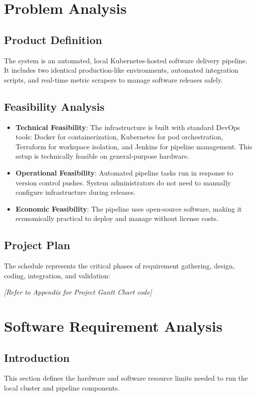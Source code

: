 \documentclass[12pt,a4paper]{article}
\begin{document}
\section{Problem Analysis}
\subsection{Product Definition}
The system is an automated, local Kubernetes-hosted software delivery pipeline. It includes two identical production-like environments, automated integration scripts, and real-time metric scrapers to manage software releases safely.

\subsection{Feasibility Analysis}
\begin{itemize}
    \item \textbf{Technical Feasibility}: The infrastructure is built with standard DevOps tools: Docker for containerization, Kubernetes for pod orchestration, Terraform for workspace isolation, and Jenkins for pipeline management. This setup is technically feasible on general-purpose hardware.
    \item \textbf{Operational Feasibility}: Automated pipeline tasks run in response to version control pushes. System administrators do not need to manually configure infrastructure during releases.
    \item \textbf{Economic Feasibility}: The pipeline uses open-source software, making it economically practical to deploy and manage without license costs.
\end{itemize}

\subsection{Project Plan}
The schedule represents the critical phases of requirement gathering, design, coding, integration, and validation:
\begin{center}
    \textit{[Refer to Appendix for Project Gantt Chart code]}
\end{center}

\section{Software Requirement Analysis}
\subsection{Introduction}
This section defines the hardware and software resource limits needed to run the local cluster and pipeline components.
\end{document}
